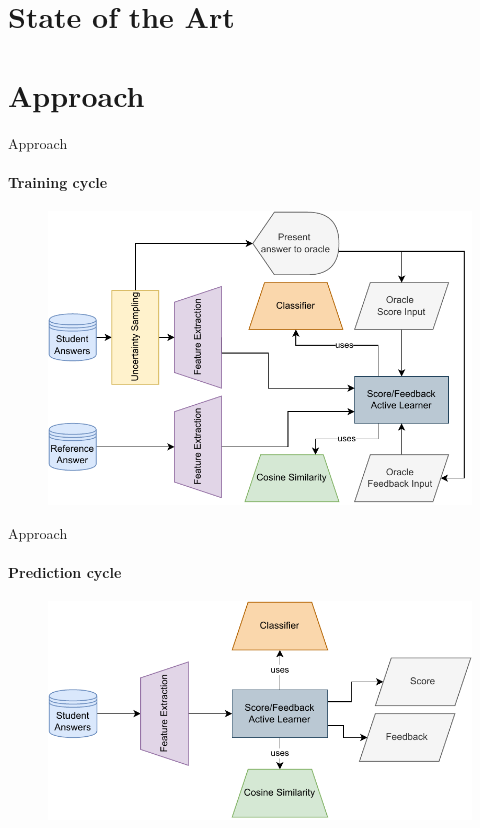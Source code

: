 \documentclass[aspectratio=169]{beamer}
\begin{document}
\section{State of the Art}
\section{Approach}
\begin{frame}{Approach}
	\framesubtitle{Training cycle}
	\begin{figure}
		\centering
		\includegraphics[scale = 0.65]{images/architecture_training.pdf}
		\label{fig:architecture train}
	\end{figure}
\end{frame}
\begin{frame}{Approach}
\framesubtitle{Prediction cycle}
\begin{figure}
	\centering
	\includegraphics[scale = 0.65]{images/architecture_prediction.pdf}
	\label{fig:architecture predict}
\end{figure}
\end{frame}
\end{document}
